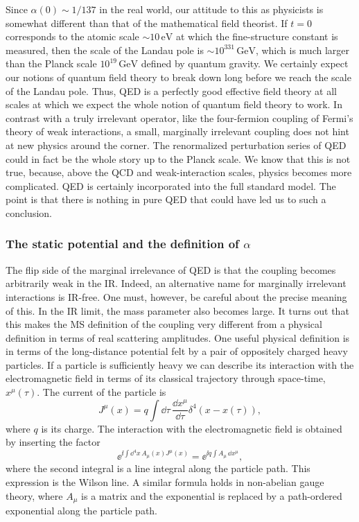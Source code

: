 Since $\alpha(0)\sim1/137$ in the real world, our attitude to this as physicists
is somewhat different than that of the mathematical field theorist. If $t=0$
corresponds to the atomic scale $\sim10\,\mathrm{eV}$ at which the
fine-structure constant is measured, then the scale of the Landau pole is
$\sim10^{331}\,\mathrm{GeV}$, which is much larger than the Planck scale
$10^{19}\,\mathrm{GeV}$ defined by quantum gravity. We certainly expect our
notions of quantum field theory to break down long before we reach the scale of
the Landau pole. Thus, QED is a perfectly good effective field theory at all
scales at which we expect the whole notion of quantum field theory to work. In
contrast with a truly irrelevant operator, like the four-fermion coupling of
Fermi's theory of weak interactions, a small, marginally irrelevant coupling
does not hint at new physics around the corner. The renormalized perturbation
series of QED could in fact be the whole story up to the Planck scale. We know
that this is not true, because, above the QCD and weak-interaction scales,
physics becomes more complicated. QED is certainly incorporated into the full
standard model. The point is that there is nothing in pure QED that could have
led us to such a conclusion.

\subsubsection{The static potential and the definition of $\alpha$}


The flip side of the marginal irrelevance of QED is that the coupling becomes
arbitrarily weak in the IR. Indeed, an alternative name for marginally
irrelevant interactions is IR-free. One must, however, be careful about the
precise meaning of this. In the IR limit, the mass parameter also becomes
large. It turns out that this makes the MS definition of the coupling very
different from a physical definition in terms of real scattering amplitudes.
One useful physical definition is in terms of the long-distance potential felt
by a pair of oppositely charged heavy particles. If a particle is sufficiently
heavy we can describe its interaction with the electromagnetic field in terms
of its classical trajectory through space-time, $x^\mu(\tau)$. The current of
the particle is
\[
  J^\mu(x)=q\int\dd\tau\,\frac{\dd x^\mu}{\dd\tau}
  \delta^4(x-x(\tau)),
\]
where $q$ is its charge. The interaction with the electromagnetic field is
obtained by inserting the factor
\[
  \ee^{\ii\int\dd^4x\,A_\mu(x)J^\mu(x)}
  =\ee^{\ii q\int A_\mu\,\dd x^\mu},
\]
where the second integral is a line integral along the particle path. This
expression is the Wilson line. A similar formula holds in non-abelian gauge
theory, where $A_\mu$ is a matrix and the exponential is replaced by a
path-ordered exponential along the particle path.

